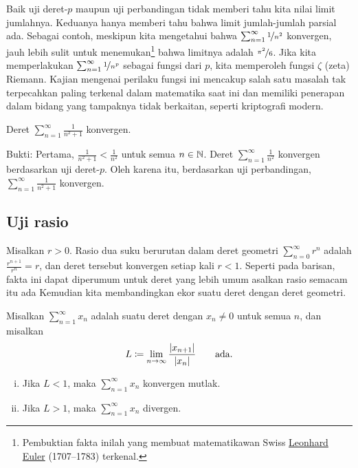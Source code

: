 Baik uji deret-$p$ maupun uji perbandingan tidak
memberi tahu kita nilai limit jumlahnya.  Keduanya hanya memberi tahu bahwa limit
jumlah-jumlah parsial ada.  Sebagai contoh, meskipun kita mengetahui bahwa
$\sum_{n=1}^\infty \nicefrac{1}{n^2}$ konvergen, jauh lebih sulit untuk
menemukan\footnote{Pembuktian fakta inilah yang
membuat matematikawan Swiss
\href{https://en.wikipedia.org/wiki/Leonhard_Euler}{Leonhard Euler}
(1707--1783)
terkenal.}
bahwa limitnya adalah $\nicefrac{\pi^2}{6}$.
Jika kita memperlakukan $\sum_{n=1}^\infty \nicefrac{1}{n^p}$ sebagai fungsi dari $p$,
kita memperoleh fungsi $\zeta$ (zeta) Riemann.  Kajian mengenai
perilaku fungsi ini mencakup
salah satu masalah tak terpecahkan paling terkenal dalam matematika saat ini dan memiliki penerapan
dalam bidang yang tampaknya tidak berkaitan, seperti kriptografi modern.

\begin{example}
Deret $\sum_{n=1}^\infty \frac{1}{n^2+1}$ konvergen.

Bukti: Pertama, $\frac{1}{n^2+1} < \frac{1}{n^2}$ untuk semua $n \in {\mathbb{N}}$.
Deret $\sum_{n=1}^\infty \frac{1}{n^2}$ konvergen berdasarkan uji deret-$p$.
Oleh karena itu, berdasarkan uji perbandingan, $\sum_{n=1}^\infty \frac{1}{n^2+1}$ konvergen.
\end{example}

\subsection{Uji rasio}

Misalkan $r > 0$.  Rasio dua suku berurutan dalam deret geometri
$\sum_{n=0}^\infty r^n$ adalah $\frac{r^{n+1}}{r^n} = r$, dan deret tersebut konvergen
setiap kali $r < 1$.  Seperti pada barisan, fakta ini
dapat diperumum untuk deret yang lebih umum
asalkan rasio semacam itu ada   Kemudian kita membandingkan
ekor suatu deret dengan deret geometri.


\begin{prop}
Misalkan $\sum_{n=1}^\infty x_n$ adalah suatu deret dengan $x_n \neq 0$ untuk semua $n$, dan misalkan
\begin{equation*}
L \coloneqq \lim_{n\to\infty} \frac{\lvert {x_{n+1}} \rvert}{\lvert {x_n} \rvert}
\qquad \text{ada.}
\end{equation*}
\begin{enumerate}[(i)]
\item
Jika $L < 1$, maka $\sum_{n=1}^\infty x_n$ konvergen mutlak.
\item
Jika $L > 1$, maka $\sum_{n=1}^\infty x_n$ divergen.
\end{enumerate}
\end{prop}

